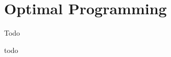 \documentclass[answers]{exam}
\begin{document}
\newpage
\section{Optimal Programming}
\begin{questions}
	
	\question Todo
	\begin{solution}[.2in]
		todo
	\end{solution}
	
\end{questions}
%
%
\end{document}
